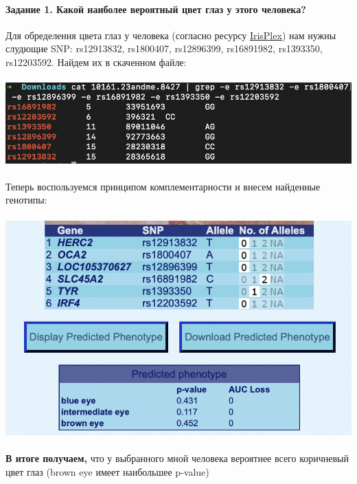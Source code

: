 \documentclass[12pt]{article}
\begin{document}
\paragraph{Задание 1. Какой наиболее вероятный цвет глаз у этого человека?
\\}
Для обределения цвета глаз у человека (согласно ресурсу \href{https://hirisplex.erasmusmc.nl}{IrisPlex}) нам нужны слудющие SNP: rs12913832, rs1800407, rs12896399, rs16891982, rs1393350, rs12203592. Найдем их в скаченном файле:\\\\
\includegraphics[width=\textwidth]{images/image0.png}\\\\
Теперь воспользуемся принципом комплементарности и внесем найденные генотипы:\\\\
\includegraphics[width=\textwidth]{images/image1.png}\\\\
\textbf{В итоге получаем,} что у выбранного мной человека вероятнее всего коричневый цвет глаз (brown eye имеет наибольшее p-value)
\newline
\end{document}
